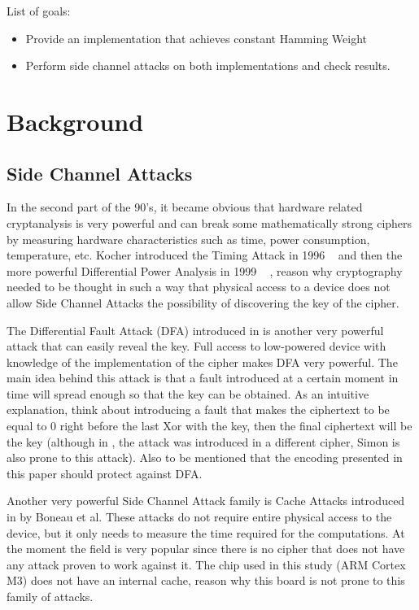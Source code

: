\documentclass[conference]{IEEEtran}
\begin{document}
List of goals:
\begin{itemize}
        \item Provide an implementation that achieves constant Hamming Weight 
        \item Perform side channel attacks on both implementations and check results.
\end{itemize}

\section{Background}\label{sec:background}

\subsection{Side Channel Attacks}

In the second part of the 90's, it became obvious that hardware related cryptanalysis is very powerful and can break some mathematically strong ciphers by measuring hardware characteristics such as time, power consumption, temperature, etc. Kocher introduced the Timing Attack in 1996 ~\cite{KocherTiming} and then the more powerful Differential Power Analysis in 1999 ~\cite{KocherDPA} , reason why cryptography needed to be thought in such a way that physical access to a device does not allow Side Channel Attacks the possibility of discovering the key of the cipher. 

The Differential Fault Attack (DFA) introduced in \cite{Piret} is another very powerful attack that can easily reveal the key. Full access to low-powered device with knowledge of the implementation of the cipher makes DFA very powerful. The main idea behind this attack is that a fault introduced at a certain moment in time will spread enough so that the key can be obtained. As an intuitive explanation, think about introducing a fault that makes the ciphertext to be equal to 0 right before the last Xor with the key, then the final ciphertext will be the key (although in \cite{Piret} , the attack was introduced in a different cipher, Simon is also prone to this attack). Also to be mentioned that the encoding presented in this paper should protect against DFA. 

Another very powerful Side Channel Attack family is Cache Attacks introduced in \cite{Boneau} by Boneau et al. These attacks do not require entire physical access to the device, but it only needs to measure the time required for the computations. At the moment the field is very popular since there is no cipher that does not have any attack proven to work against it. The chip used in this study (ARM Cortex M3) does not have an internal cache, reason why this board is not prone to this family of attacks.
\end{document}

